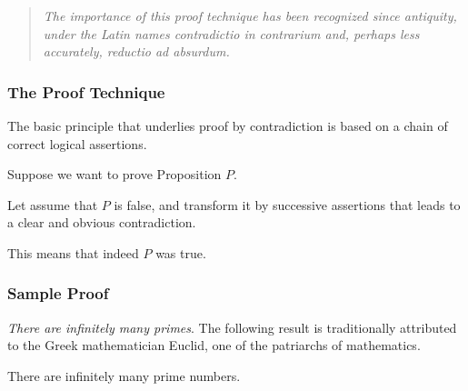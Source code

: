 \begin{quote}
{\em The importance of this proof technique has been recognized since
  antiquity, under the Latin names {\em contradictio in contrarium}
  and, perhaps less accurately, {\em reductio ad absurdum}.}
\end{quote}


\subsubsection{The Proof Technique}
\label{sec:contradiction-technique}

The basic principle that underlies proof by contradiction is based on a chain of correct logical assertions.

Suppose we want to prove Proposition $P$. 

Let assume that $P$ is false, and transform it by successive assertions
that leads to a clear and obvious contradiction.

This means that indeed $P$ was true.


\subsubsection{Sample Proof}
\label{sec:sample-contradictions}

{\it There are infinitely many primes}.
The following result is traditionally attributed to the Greek
mathematician Euclid, one of the patriarchs of
mathematics.

\begin{prop}
\label{thm:Primes-infinite}
There are infinitely many prime numbers.
\end{prop}

